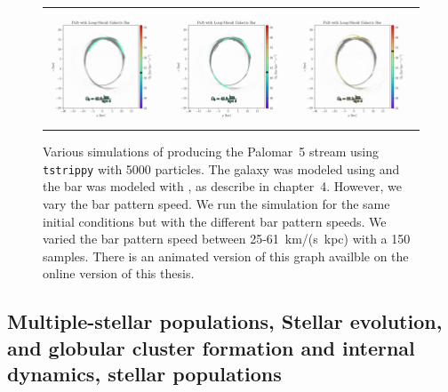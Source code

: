 \begin{figure}
\begin{tabular}{ccc}
                    \includegraphics[width=.32\linewidth]{images/frame_0065.png}&
                    \includegraphics[width=.32\linewidth]{images/frame_0066.png}&
                    \includegraphics[width=.32\linewidth]{images/frame_0104.png}\\
                \end{tabular}
                \caption[The presence of a stellar bar with different rotational speeds damaging the Palomar~5 stream]{Various simulations of producing the Palomar~5 stream using \texttt{tstrippy} with 5000 particles. The galaxy was modeled using \citet{2017A&A...598A..66P} and the bar was modeled with \citet{1997MNRAS.291..717M}, as describe in chapter~4. However, we vary the bar pattern speed. We run the simulation for the same initial conditions but with the different bar pattern speeds. We varied the bar pattern speed between 25-61~km/(s~kpc) with a 150 samples. There is an animated version of this graph availble on the online version of this thesis.}
                \label{fig:pal5_with_bar}
            \end{figure}

    \subsection{Multiple-stellar populations, Stellar evolution, and globular cluster formation and internal dynamics, stellar populations}

